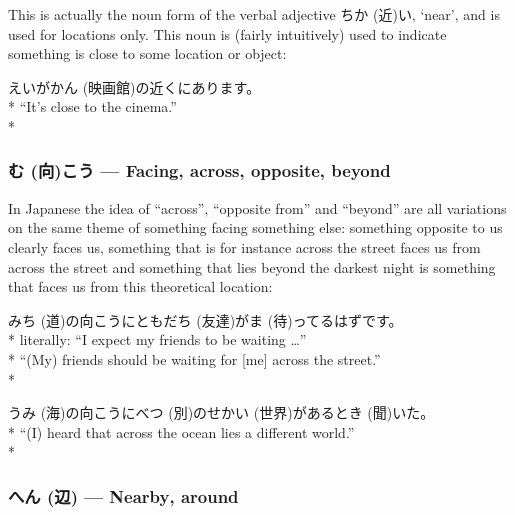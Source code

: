 \documentclass[11pt, b5paper, twoside, openright, onecolumn]{book}
\makeatletter
\newcommand*{\rubystack}[2]{{\relscale{0.5}%
  \begin{tabular}[b]{@{}c@{}}%
    {#1}\\%
   {\textscale{2}{#2}}%
  \end{tabular}}%
}
\DeclareRobustCommand*{\ruby}[2]{%
  \mbox{%
    \setlength{\parskip}{0ex}%
    \BeginAccSupp{method=pdfstringdef,ActualText={#1}}%
      \rubystack{\phantom{#2}}{#1}%
      \llap{%
        \rubystack{#2}{\phantom{#1}}%
      }%
    \EndAccSupp{}%
  }%
}
\renewcommand*{\ruby}[2]{#2 (#1)}%
\newenvironment{exampleblock}{
\setlength{\parindent}{0.6in}
\begin{minipage}[t]{\dimexpr\textwidth-\parindent}}
{\end{minipage}}
\makeatother
\begin{document}
This is actually the noun form of the verbal adjective \ruby{近}{ちか}い‚ ‘near’‚ and is used for locations only. This noun is (fairly intuitively) used to indicate something is close to some location or object:

\vspace{0.4cm}
\begin{exampleblock}
\ruby{映画館}{えいがかん}の近くにあります。 \\* 
“It’s close to the cinema.” \\* 
\end{exampleblock}
\subsubsection{\ruby{向}{む}こう — Facing‚ across‚ opposite‚ beyond}


In Japanese the idea of “across”‚ “opposite from” and “beyond” are all variations on the same theme of something facing something else: something opposite to us clearly faces us‚ something that is for instance across the street faces us from across the street and something that lies beyond the darkest night is something that faces us from this theoretical location:

\vspace{0.4cm}
\begin{exampleblock}
\ruby{道}{みち}の向こうに\ruby{友達}{ともだち}が\ruby{待}{ま}ってるはずです。 \\* 
literally: “I expect my friends to be waiting …” \\* 
“(My) friends should be waiting for [me] across the street.” \\* 
\end{exampleblock}
\vspace{0.2cm}

\begin{exampleblock}
\ruby{海}{うみ}の向こうに\ruby{別}{べつ}の\ruby{世界}{せかい}があると\ruby{聞}{き}いた。 \\* 
“(I) heard that across the ocean lies a different world.” \\* 
\end{exampleblock}
\subsubsection{\ruby{辺}{へん} — Nearby‚ around}
\end{document}
